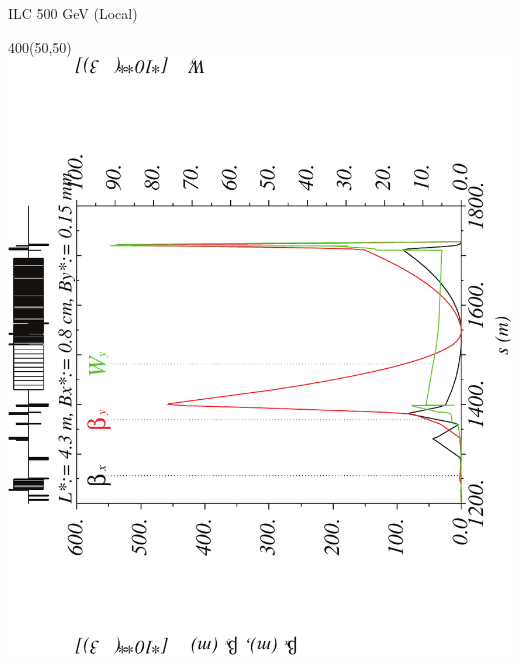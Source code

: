 \documentclass{beamer}
\begin{document}
\begin{frame}{ILC 500 GeV (Local)}
  \setlength{\TPHorizModule}{1pt}
  \setlength{\TPVertModule}{1pt}
 \begin{textblock}{400}(50,50)
 \includegraphics[scale=0.4,angle=-90]{ILClocal_wy-crop.pdf}
 \end{textblock}
\end{frame}
\end{document}
